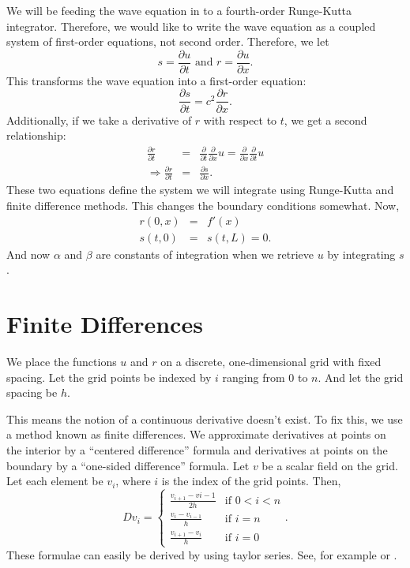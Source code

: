\documentclass[]{article}
\begin{document}
We will be feeding the wave equation in to a fourth-order Runge-Kutta
integrator. Therefore, we would like to write the wave equation as a
coupled system of first-order equations, not second order. Therefore, we let
\begin{equation}
  \label{eq:r:s:def}
  s = \frac{\partial u}{\partial t}\text{ and }r = \frac{\partial u}{\partial x}.
\end{equation}
This transforms the wave equation into a first-order equation:
\begin{equation}
  \label{eq:wave:transformed:1}
  \frac{\partial s}{\partial t} = c^2 \frac{\partial r}{\partial x}.
\end{equation}
Additionally, if we take a derivative of $r$ with respect to $t$, we
get a second relationship:
\begin{eqnarray}
  \label{eq:wave:transformed:2}
  \frac{\partial r}{\partial t} &=& \frac{\partial}{\partial t}\frac{\partial }{\partial x}u = \frac{\partial }{\partial x}\frac{\partial }{\partial t}u\nonumber\\
  \Rightarrow \frac{\partial r}{\partial t} &=& \frac{\partial s}{\partial x}.
\end{eqnarray}
These two equations define the system we will integrate using
Runge-Kutta and finite difference methods. This changes the boundary
conditions somewhat. Now,
\begin{eqnarray}
  \label{eq:boundary:conditions:r:s}
  r(0,x) &=& f'(x)\\
  s(t,0) &=& s(t,L) = 0.
\end{eqnarray}
And now $\alpha$ and $\beta$ are constants of integration when we
retrieve $u$ by integrating $s$.

\section{Finite Differences}

We place the functions $u$ and $r$ on a discrete, one-dimensional grid
with fixed spacing. Let the grid points be indexed by $i$ ranging from
0 to $n$. And let the grid spacing be $h$.

This means the notion of a continuous derivative
doesn't exist. To fix this, we use a method known as finite
differences. We approximate derivatives at points on the interior by a
``centered difference'' formula and derivatives at points on the
boundary by a ``one-sided difference'' formula. Let $v$ be a scalar
field on the grid. Let each element be $v_i$, where $i$ is the index
of the grid points. Then,
\begin{equation}
  \label{eq:derivative:operator}
  D v_i = \begin{cases}
    \frac{v_{i+1} - v{i-1}}{2h}&\text{if }0 < i < n\\
    \frac{v_i-v_{i-1}}{h}&\text{if }i = n\\
    \frac{v_{i+1}-v_i}{h}&\text{if }i = 0
  \end{cases}.
\end{equation}
These formulae can easily be derived by using taylor series. See, for
example \cite{wikifinitedifferences} or \cite{Heath}.
\end{document}
